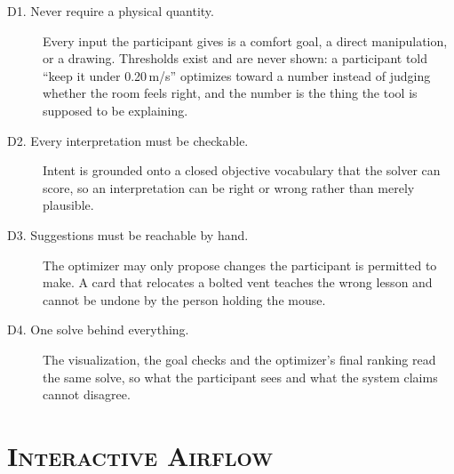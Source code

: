 \documentclass[manuscript,review,anonymous]{acmart}
\begin{document}
\begin{description}
  \item[D1. Never require a physical quantity.] Every input the participant
    gives is a comfort goal, a direct manipulation, or a drawing. Thresholds
    exist and are never shown: a participant told ``keep it under
    0.20\,m/s'' optimizes toward a number instead of judging whether the room
    feels right, and the number is the thing the tool is supposed to be
    explaining.
  \item[D2. Every interpretation must be checkable.] Intent is grounded onto a
    closed objective vocabulary that the solver can score, so an interpretation
    can be right or wrong rather than merely plausible.
  \item[D3. Suggestions must be reachable by hand.] The optimizer may only
    propose changes the participant is permitted to make. A card that relocates
    a bolted vent teaches the wrong lesson and cannot be undone by the person
    holding the mouse.
  \item[D4. One solve behind everything.] The visualization, the goal checks and
    the optimizer's final ranking read the same solve, so what the participant
    sees and what the system claims cannot disagree.
\end{description}

\section{\textsc{Interactive Airflow}}
\end{document}
